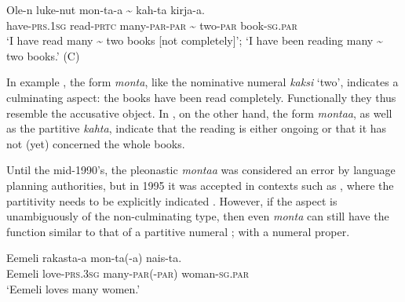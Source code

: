 \documentclass[output=paper]{LSP/langsci}
\begin{document}
\ea%
\label{15-hu-ex:55}

\gll Ole-n luke-nut mon-ta-a {\textasciitilde} kah-ta kirja-a.\\
have-\textsc{prs}.\textsc{1sg} read-\textsc{prtc} many-\textsc{par}-\textsc{par} {\textasciitilde} two-\textsc{par} book-\textsc{sg}.\textsc{par}\\
\glt ‘I have read many {\textasciitilde} two books [not completely]’; ‘I have been reading many {\textasciitilde} two books.’   (C)
\z



In example , the form \textit{monta}, like the nominative numeral \textit{kaksi} ‘two’, indicates a culminating aspect: the books have been read completely. Functionally they thus resemble the accusative object. In , on the other hand, the form \textit{montaa}, as well as the partitive \textit{kahta}, indicate that the reading is either ongoing or that it has not (yet) concerned the whole books. 

Until the mid-1990’s, the pleonastic \textit{montaa} was considered an error by language planning authorities, but in 1995 it was accepted in contexts such as , where the partitivity needs to be explicitly indicated \citep{Lansimaki1995Montaa,Nyman2000Naekymaetoen,Branch2001Montaa}. However, if the aspect is unambiguously of the non-culminating type, then even \textit{monta} can still have the function similar to that of a partitive numeral ; \cf {} with a numeral proper.

\ea\label{15-hu-ex:56}
\gll Eemeli rakasta-a mon-ta(-a) nais-ta.\\
 Eemeli love-\textsc{prs}.\textsc{3sg} many-\textsc{par}(-\textsc{par}) woman-\textsc{sg}.\textsc{par}\\
\glt ‘Eemeli loves many women.’
\z
\end{document}
